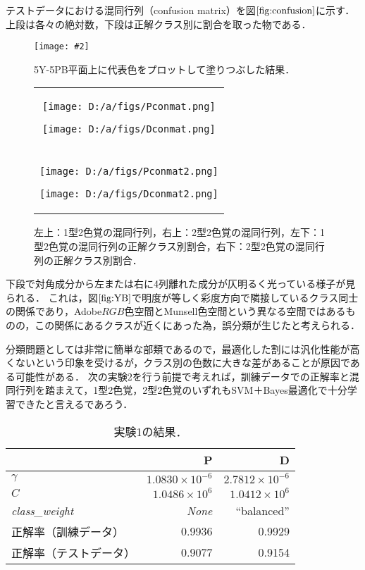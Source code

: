 \documentclass[uplatex,paper=a4,fontsize=4.0truemm,jafontsize=4.0truemm,head_space=30.0truemm,foot_space=30.0truemm,baselineskip=8.0truemm,line_length=40zw,gutter=25.0truemm,oneside,openany,fleqn,hanging_panctuation,open_bracket_pos=nibu_tentsuki,dvipdfmx,jis2004,book,titlepage]{jlreq}
\theoremstyle{mystyle}
\newcommand{\captiondot}[1]{\caption{#1．}}
\newcommand{\figureinput}[4]{\begin{figure}[btp]\centering\texttt{[image: \#2]}\captiondot{#3}\label{fig:#4}\end{figure}}
\newcommand{\tableinput}[4]{\begin{table}[btp]\centering\captiondot{#3}\label{tab:#4}\begin{tabular}{#1}#2\end{tabular}\end{table}}
\newcommand{\mathdisplaystyle}[1]{\(\displaystyle{#1}\)}
\newcommand{\Reference}[1]{\mathdisplaystyle{\ref{#1}}}
\begin{document}
				テストデータにおける混同行列（confusion matrix）を図\Reference{fig:confusion}に示す．
				上段は各々の絶対数，下段は正解クラス別に割合を取った物である．
				\figureinput{width=\linewidth}{D:/a/figs/YB.png}{5Y-5PB平面上に代表色をプロットして塗りつぶした結果}{YB}
				\begin{figure}[tbp]
					\centering
					\begin{tabular}{c}
						\begin{minipage}{0.5\linewidth}
							\centering
							\texttt{[image: D:/a/figs/Pconmat.png]}
						\end{minipage}
						\begin{minipage}{0.5\linewidth}
							\centering
							\texttt{[image: D:/a/figs/Dconmat.png]}
						\end{minipage} \\
						\begin{minipage}{0.06\linewidth}
							\vspace{10truemm}
						\end{minipage} \\
						\begin{minipage}{0.5\linewidth}
							\centering
							\texttt{[image: D:/a/figs/Pconmat2.png]}
						\end{minipage}
						\begin{minipage}{0.5\linewidth}
							\centering
							\texttt{[image: D:/a/figs/Dconmat2.png]}
						\end{minipage}
					\end{tabular}
					\captiondot{左上：1型2色覚の混同行列，右上：2型2色覚の混同行列，左下：1型2色覚の混同行列の正解クラス別割合，右下：2型2色覚の混同行列の正解クラス別割合}\label{fig:confusion}
				\end{figure}
				下段で対角成分から左または右に4列離れた成分が仄明るく光っている様子が見られる．
				これは，図\Reference{fig:YB}で明度が等しく彩度方向で隣接しているクラス同士の関係であり，Adobe\mathdisplaystyle{RGB}色空間とMunsell色空間という異なる空間ではあるものの，この関係にあるクラスが近くにあった為，誤分類が生じたと考えられる．

				分類問題としては非常に簡単な部類であるので，最適化した割には汎化性能が高くないという印象を受けるが，クラス別の色数に大きな差があることが原因である可能性がある．
				次の実験2を行う前提で考えれば，訓練データでの正解率と混同行列を踏まえて，1型2色覚，2型2色覚のいずれもSVM＋Bayes最適化で十分学習できたと言えるであろう．
				\tableinput{l|rr}{ & P & D \\ \hline
					\mathdisplaystyle{\gamma} & \mathdisplaystyle{1.0830\times{10}^{-6}} & \mathdisplaystyle{2.7812\times{10}^{-6}} \\
					\mathdisplaystyle{C} & \mathdisplaystyle{1.0486\times{10}^6} & \mathdisplaystyle{1.0412\times{10}^6} \\
					\textit{class\_weight} & \textit{None} & ``balanced'' \\
					正解率（訓練データ） & 0.9936 & 0.9929 \\
					正解率（テストデータ） & 0.9077 & 0.9154}{実験1の結果}{result1}
\end{document}
